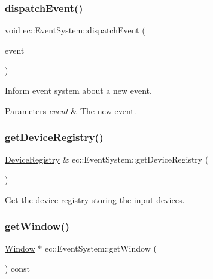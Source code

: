 \subsubsection{\texorpdfstring{dispatch\+Event()}{dispatchEvent()}}
{\footnotesize\ttfamily void ec\+::\+Event\+System\+::dispatch\+Event (\begin{DoxyParamCaption}\item[{const \mbox{\hyperlink{structec_1_1_input_event}{Input\+Event}} \&}]{event }\end{DoxyParamCaption})}



Inform event system about a new event. 


\begin{DoxyParams}{Parameters}
{\em event} & The new event. \\
\hline
\end{DoxyParams}
\mbox{\label{classec_1_1_event_system_a8c84a98e39be4a735dc882e19e4b309a}} 
\subsubsection{\texorpdfstring{get\+Device\+Registry()}{getDeviceRegistry()}}
{\footnotesize\ttfamily \mbox{\hyperlink{classec_1_1_device_registry}{Device\+Registry}} \& ec\+::\+Event\+System\+::get\+Device\+Registry (\begin{DoxyParamCaption}{ }\end{DoxyParamCaption})}



Get the device registry storing the input devices. 

\mbox{\label{classec_1_1_event_system_a49289b02be391da14f42cef7bbb63fc3}} 
\subsubsection{\texorpdfstring{get\+Window()}{getWindow()}}
{\footnotesize\ttfamily \mbox{\hyperlink{classec_1_1_window}{Window}} $\ast$ ec\+::\+Event\+System\+::get\+Window (\begin{DoxyParamCaption}{ }\end{DoxyParamCaption}) const}



